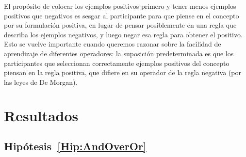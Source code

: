 El propósito de colocar los ejemplos positivos primero y tener menos ejemplos positivos que negativos es sesgar al participante para que piense en el concepto por su formulación positiva, en lugar de pensar posiblemente en una regla que describa los ejemplos negativos, y luego negar esa regla para obtener el positivo. Esto se vuelve importante cuando queremos razonar sobre la facilidad de aprendizaje de diferentes operadores: la suposición predeterminada es que los participantes que seleccionan correctamente ejemplos positivos del concepto piensan en la regla positiva, que difiere en su operador de la regla negativa (por las leyes de De Morgan).


\section{Resultados}\label{Results}


\subsection{Hipótesis~\ref{Hip:AndOverOr}}\label{Results:AndOverOr}

